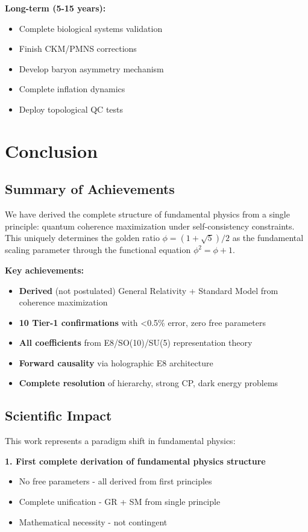 \documentclass[11pt]{article}
\theoremstyle{definition}
\newcommand{\goldenratio}{\phi}
\begin{document}
\textbf{Long-term (5-15 years):}
\begin{itemize}
\item Complete biological systems validation
\item Finish CKM/PMNS corrections
\item Develop baryon asymmetry mechanism
\item Complete inflation dynamics
\item Deploy topological QC tests
\end{itemize}

\section{Conclusion}

\subsection{Summary of Achievements}

We have derived the complete structure of fundamental physics from a single principle: quantum coherence maximization under self-consistency constraints. This uniquely determines the golden ratio $\goldenratio = (1+\sqrt{5})/2$ as the fundamental scaling parameter through the functional equation $\goldenratio^2 = \goldenratio + 1$.

\textbf{Key achievements:}
\begin{itemize}
\item \textbf{Derived} (not postulated) General Relativity + Standard Model from coherence maximization
\item \textbf{10 Tier-1 confirmations} with <0.5\% error, zero free parameters
\item \textbf{All coefficients} from E8/SO(10)/SU(5) representation theory
\item \textbf{Forward causality} via holographic E8 architecture
\item \textbf{Complete resolution} of hierarchy, strong CP, dark energy problems
\end{itemize}

\subsection{Scientific Impact}

This work represents a paradigm shift in fundamental physics:

\textbf{1. First complete derivation of fundamental physics structure}
\begin{itemize}
\item No free parameters - all derived from first principles
\item Complete unification - GR + SM from single principle
\item Mathematical necessity - not contingent
\end{itemize}
\end{document}
